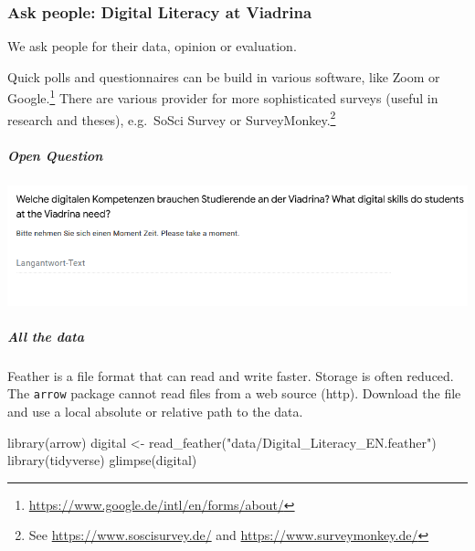 \documentclass[
]{book}
\newenvironment{Shaded}{\begin{snugshade}}{\end{snugshade}}
\newcommand{\FunctionTok}[1]{\textcolor[rgb]{0.00,0.00,0.00}{#1}}
\newcommand{\NormalTok}[1]{#1}
\newcommand{\OtherTok}[1]{\textcolor[rgb]{0.56,0.35,0.01}{#1}}
\newcommand{\StringTok}[1]{\textcolor[rgb]{0.31,0.60,0.02}{#1}}
\begin{document}
\hypertarget{ask-people-digital-literacy-at-viadrina}{%
\subsubsection{Ask people: Digital Literacy at Viadrina}\label{ask-people-digital-literacy-at-viadrina}}

We ask people for their data, opinion or evaluation.

Quick polls and questionnaires can be build in various software, like Zoom or Google.\footnote{\url{https://www.google.de/intl/en/forms/about/}} There are various provider for more sophisticated surveys (useful in research and theses), e.g.~SoSci Survey or SurveyMonkey.\footnote{See \url{https://www.soscisurvey.de/} and \url{https://www.surveymonkey.de/}}

\hypertarget{open-question}{%
\subparagraph{Open Question}\label{open-question}}

\includegraphics{images/Item2.png}

\hypertarget{all-the-data}{%
\subparagraph{All the data}\label{all-the-data}}

Feather is a file format that can read and write faster. Storage is often reduced. The \texttt{arrow} package cannot read files from a web source (http). Download the file and use a local absolute or relative path to the data.

\begin{Shaded}
\begin{Highlighting}[]
\FunctionTok{library}\NormalTok{(arrow)}
\NormalTok{digital }\OtherTok{\textless{}{-}} \FunctionTok{read\_feather}\NormalTok{(}\StringTok{"data/Digital\_Literacy\_EN.feather"}\NormalTok{)}
\FunctionTok{library}\NormalTok{(tidyverse)}
\FunctionTok{glimpse}\NormalTok{(digital)}
\end{Highlighting}
\end{Shaded}
\end{document}
